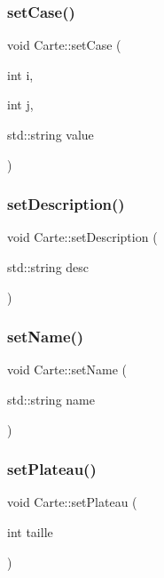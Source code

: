 \mbox{\label{class_carte_ac7dc1d4cb0accd36b36cb6c6c89103fd}} 
\subsubsection{\texorpdfstring{set\+Case()}{setCase()}}
{\footnotesize\ttfamily void Carte\+::set\+Case (\begin{DoxyParamCaption}\item[{int}]{i,  }\item[{int}]{j,  }\item[{std\+::string}]{value }\end{DoxyParamCaption})}

\mbox{\label{class_carte_afda8b2f0e96175d97c42afe87f535e15}} 
\subsubsection{\texorpdfstring{set\+Description()}{setDescription()}}
{\footnotesize\ttfamily void Carte\+::set\+Description (\begin{DoxyParamCaption}\item[{std\+::string}]{desc }\end{DoxyParamCaption})}

\mbox{\label{class_carte_a1d79dbe6ded5abd1e3f1a3192af0720e}} 
\subsubsection{\texorpdfstring{set\+Name()}{setName()}}
{\footnotesize\ttfamily void Carte\+::set\+Name (\begin{DoxyParamCaption}\item[{std\+::string}]{name }\end{DoxyParamCaption})}

\mbox{\label{class_carte_ae9928759af0c0a63eb93039ec0d053b4}} 
\subsubsection{\texorpdfstring{set\+Plateau()}{setPlateau()}}
{\footnotesize\ttfamily void Carte\+::set\+Plateau (\begin{DoxyParamCaption}\item[{int}]{taille }\end{DoxyParamCaption})}

